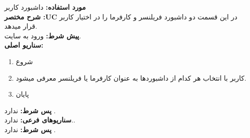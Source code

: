 \documentclass[20pt,a5paper]{report}
\begin{document}
\noindent \textbf{مورد استفاده:}
داشبورد کاربر
\\
\textbf{شرح مختصر :UC}
در این قسمت دو داشبورد فریلنسر و کارفرما را در اختیار کاربر قرار میدهد.
\\
\textbf{پيش شرط:}
ورود به سایت.
\\
\textbf{سناريو اصلی:}
\begin{enumerate}
\item
شروع
\item
کاربر با انتخاب هر کدام از داشبوردها به عنوان کارفرما یا فریلنسر معرفی میشود.
\item
پایان
\end{enumerate}
\textbf{پس شرط:}
ندارد .
\\
\textbf{سناريوهای فرعی:}
ندارد..
\\
\textbf{پس شرط:}
ندارد .


\centering
\vfill
\lr{\LaTeX}
\end{document}
